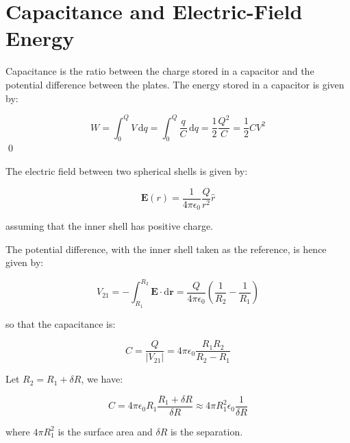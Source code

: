 \documentclass[12pt]{article}
\begin{document}



\pagebreak
\section*{Capacitance and Electric-Field Energy}


Capacitance is the ratio between the charge stored in a capacitor and the potential difference between the plates. The energy stored in a capacitor is given by:

\begin{equation}
    W = \int_{0}^{Q} V \, \mathrm{d}q = \int_{0}^{Q} \frac{q}{C} \, \mathrm{d}q = \frac{1}{2} \frac{Q^{2}}{C} = \frac{1}{2} CV^{2}
\end{equation}
\qed



The electric field between two spherical shells is given by:

\begin{equation}
    \mathbf{E}(r) = \frac{1}{4\pi \epsilon_{0}} \frac{Q}{r^{2}} \hat{r}
\end{equation}

assuming that the inner shell has positive charge.

The potential difference, with the inner shell taken as the reference, is hence given by:

\begin{equation}
    V_{21} = -\int_{R_{1}}^{R_{2}} \mathbf{E} \cdot \mathrm{d}\mathbf{r} = \frac{Q}{4\pi \epsilon_{0}} \left( \frac{1}{R_{2}} - \frac{1}{R_{1}} \right)
\end{equation}

so that the capacitance is:

\begin{equation}
    C = \frac{Q}{\left\lvert V_{21} \right\rvert} = 4\pi \epsilon_{0} \frac{R_{1} R_{2}}{R_{2} - R_{1}}
\end{equation}

Let $R_{2} = R_{1} + \delta R$, we have:

\begin{equation}
    C = 4\pi \epsilon_{0} R_{1} \frac{R_{1} + \delta R}{\delta R} \approx 4\pi R_{1}^{2} \epsilon_{0} \frac{1}{\delta R}
\end{equation}

where $4\pi R_{1}^{2}$ is the surface area and $\delta R$ is the separation.
\end{document}
